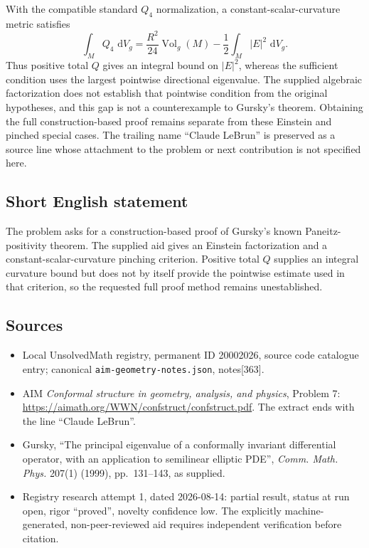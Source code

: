 \documentclass[11pt]{article}
\newcommand{\dd}{\,\mathrm{d}}
\begin{document}
With the compatible standard $Q_4$ normalization, a constant-scalar-curvature metric satisfies
\[
 \int_MQ_4\,\dd V_g
 =\frac{R^2}{24}\operatorname{Vol}_g(M)-\frac12\int_M|E|^2\,\dd V_g.
\]
Thus positive total $Q$ gives an integral bound on $|E|^2$, whereas the sufficient condition uses the largest pointwise directional eigenvalue. The supplied algebraic factorization does not establish that pointwise condition from the original hypotheses, and this gap is not a counterexample to Gursky's theorem. Obtaining the full construction-based proof remains separate from these Einstein and pinched special cases. The trailing name ``Claude LeBrun'' is preserved as a source line whose attachment to the problem or next contribution is not specified here.
\subsection{Short English statement}
The problem asks for a construction-based proof of Gursky's known Paneitz-positivity theorem. The supplied aid gives an Einstein factorization and a constant-scalar-curvature pinching criterion. Positive total $Q$ supplies an integral curvature bound but does not by itself provide the pointwise estimate used in that criterion, so the requested full proof method remains unestablished.
\subsection{Sources}
\begin{itemize}
\item Local UnsolvedMath registry, permanent ID 20002026, source code catalogue entry; canonical \texttt{aim-geometry-notes.json}, notes[363].
\item AIM \emph{Conformal structure in geometry, analysis, and physics}, Problem 7: \url{https://aimath.org/WWN/confstruct/confstruct.pdf}. The extract ends with the line ``Claude LeBrun''.
\item Gursky, ``The principal eigenvalue of a conformally invariant differential operator, with an application to semilinear elliptic PDE'', \emph{Comm. Math. Phys.} 207(1) (1999), pp.~131--143, as supplied.
\item Registry research attempt 1, dated 2026-08-14: partial result, status at run open, rigor ``proved'', novelty confidence low. The explicitly machine-generated, non-peer-reviewed aid requires independent verification before citation.
\end{itemize}
\end{document}

